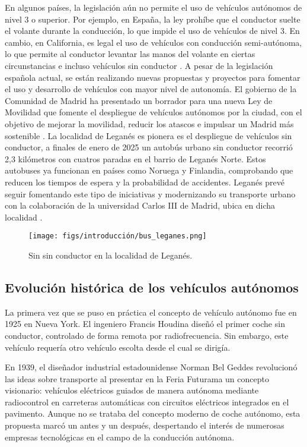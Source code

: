 En algunos países, la legislación aún no permite el uso de vehículos autónomos de nivel 3 o superior. Por ejemplo, en España, la ley prohíbe que el conductor suelte el volante durante la conducción, lo que impide el uso de vehículos de nivel 3. En cambio, en California, es legal el uso de vehículos con conducción semi-autónoma, lo que permite al conductor levantar las manos del volante en ciertas circunstancias  e incluso vehículos sin conductor \cite{carwow-autonomous}. A pesar de la legislación española actual, se están realizando nuevas propuestas y proyectos para fomentar el uso y desarrollo de vehículos con mayor nivel de autonomía. El gobierno de la Comunidad de Madrid ha presentado un borrador para una nueva Ley de Movilidad que fomente el despliegue de vehículos autónomos por la ciudad, con el objetivo de mejorar la movilidad, reducir los atascos e impulsar un Madrid más sostenible \cite{com-madrid}. La localidad de Leganés es pionera es el despliegue de vehículos sin conductor, a finales de enero de 2025 un autobús urbano sin conductor recorrió 2,3 kilómetros con cuatros paradas en el barrio de Leganés Norte. Estos autobuses ya funcionan en países como Noruega y Finlandia, comprobando que reducen los tiempos de espera y la probabilidad de accidentes. Leganés prevé seguir fomentando este tipo de iniciativas y modernizando su transporte urbano con la colaboración de la universidad Carlos III de Madrid, ubica en dicha localidad \cite{leganes}.
\begin{figure} [ht]
\begin{center}
\texttt{[image: figs/introducción/bus\_leganes.png]}
\end{center}
\caption{Sin sin conductor en la localidad de Leganés.}
\label{leganes-photo}
\end{figure}

\subsection{Evolución histórica de los vehículos autónomos}
\label{sec:historia}

La primera vez que se puso en práctica el concepto de vehículo autónomo fue en 1925 en Nueva York. El ingeniero Francis Houdina diseñó el primer coche sin conductor, controlado de forma remota por radiofrecuencia. Sin embargo, este vehículo requería otro vehículo escolta desde el cual se dirigía.

En 1939, el diseñador industrial estadounidense Norman Bel Geddes revolucionó las ideas sobre transporte al presentar en la Feria Futurama un concepto visionario: vehículos eléctricos guiados de manera autónoma mediante radiocontrol en carreteras automáticas con circuitos eléctricos integrados en el pavimento. Aunque no se trataba del concepto moderno de coche autónomo, esta propuesta marcó un antes y un después, despertando el interés de numerosas empresas tecnológicas en el campo de la conducción autónoma.


